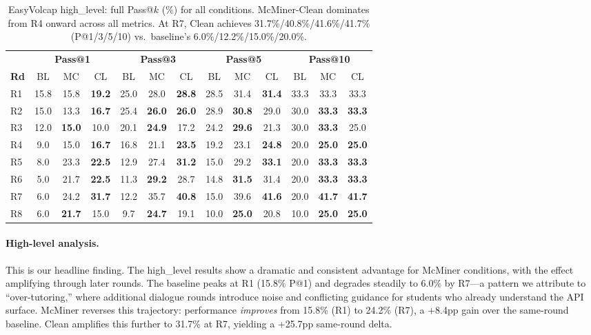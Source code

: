 \documentclass[11pt]{article}
\begin{document}
\begin{table}[t]
  \centering
  \small
  \begin{tabular}{l|ccc|ccc|ccc|ccc}
    \toprule
    & \multicolumn{3}{c|}{\textbf{Pass@1}} & \multicolumn{3}{c|}{\textbf{Pass@3}} & \multicolumn{3}{c|}{\textbf{Pass@5}} & \multicolumn{3}{c}{\textbf{Pass@10}} \\
    \textbf{Rd} & BL & MC & CL & BL & MC & CL & BL & MC & CL & BL & MC & CL \\
    \midrule
    R1 & 15.8 & 15.8 & \textbf{19.2}  & 25.0 & 28.0 & \textbf{28.8}  & 28.5 & 31.4 & \textbf{31.4}  & 33.3 & 33.3 & 33.3 \\
    R2 & 15.0 & 13.3 & \textbf{16.7}  & 25.4 & \textbf{26.0} & \textbf{26.0}  & 28.9 & \textbf{30.8} & 29.0  & 30.0 & \textbf{33.3} & \textbf{33.3} \\
    R3 & 12.0 & \textbf{15.0} & 10.0  & 20.1 & \textbf{24.9} & 17.2  & 24.2 & \textbf{29.6} & 21.3  & 30.0 & \textbf{33.3} & 25.0 \\
    R4 & 9.0 & 15.0 & \textbf{16.7}  & 16.8 & 21.1 & \textbf{23.5}  & 19.2 & 23.1 & \textbf{24.8}  & 20.0 & \textbf{25.0} & \textbf{25.0} \\
    R5 & 8.0 & 23.3 & \textbf{22.5}  & 12.9 & 27.4 & \textbf{31.2}  & 15.0 & 29.2 & \textbf{33.1}  & 20.0 & \textbf{33.3} & \textbf{33.3} \\
    R6 & 5.0 & 21.7 & \textbf{22.5}  & 11.3 & \textbf{29.2} & 28.7  & 14.8 & \textbf{31.5} & 31.4  & 20.0 & \textbf{33.3} & \textbf{33.3} \\
    R7 & 6.0 & 24.2 & \textbf{31.7}  & 12.2 & 35.7 & \textbf{40.8}  & 15.0 & 39.6 & \textbf{41.6}  & 20.0 & \textbf{41.7} & \textbf{41.7} \\
    R8 & 6.0 & \textbf{21.7} & 15.0  & 9.7 & \textbf{24.7} & 19.1  & 10.0 & \textbf{25.0} & 20.8  & 10.0 & \textbf{25.0} & \textbf{25.0} \\
    \bottomrule
  \end{tabular}
  \caption{EasyVolcap high\_level: full Pass@$k$ (\%) for all conditions. McMiner-Clean dominates from R4 onward across all metrics. At R7, Clean achieves 31.7\%/40.8\%/41.6\%/41.7\% (P@1/3/5/10) vs.\ baseline's 6.0\%/12.2\%/15.0\%/20.0\%.}
  \label{tab:app-ev-high}
\end{table}

\paragraph{High-level analysis.} This is our headline finding. The high\_level results show a dramatic and consistent advantage for McMiner conditions, with the effect amplifying through later rounds. The baseline peaks at R1 (15.8\% P@1) and degrades steadily to 6.0\% by R7---a pattern we attribute to ``over-tutoring,'' where additional dialogue rounds introduce noise and conflicting guidance for students who already understand the API surface. McMiner reverses this trajectory: performance \emph{improves} from 15.8\% (R1) to 24.2\% (R7), a +8.4pp gain over the same-round baseline. Clean amplifies this further to 31.7\% at R7, yielding a +25.7pp same-round delta.
\end{document}
